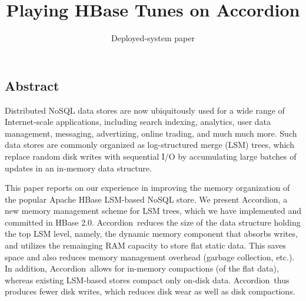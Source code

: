 \documentclass[letterpaper,twocolumn,10pt]{article}
\newcommand{\remove}[1]{}
\newcommand{\tb}{\hspace{5mm}}
\newcommand{\sys}{Accordion}
\begin{document}
\date{}

\title{\Large \bf  Playing HBase Tunes on \sys}


\author{
\remove{
Edward Bortnikov\footnotemark[1]  \tb
Anastasia Braginsky\footnotemark[1]  \tb
Eshcar Hillel\footnotemark[1] \tb 
Idit Keidar\footnotemark[1] \footnotemark[2] \\
	\footnotemark[1] Yahoo Research\ \ \footnotemark[2] Technion  \\ [2mm]
}
Deployed-system paper
} %


\maketitle




\subsection*{Abstract}

Distributed NoSQL data stores are now ubiquitously used for a wide range of Internet-scale applications, 
including search indexing, analytics, user data management, messaging, advertizing, online trading, and much much more.
Such data stores are commonly organized as  log-structured merge (LSM) trees, 
which replace random disk writes with sequential I/O by accumulating large batches of updates 
in an in-memory data structure. 
\remove{
and merging it with  on-disk store in the background. 
}

This paper  reports on our experience in improving the memory organization of the popular 
Apache HBase LSM-based NoSQL store. 
We present \sys, a new memory management scheme for LSM trees, which we have implemented and 
committed in HBase 2.0.
\sys\ reduces the size of the data structure holding the 
 top LSM level, namely, the dynamic memory component that absorbs writes, and utilizes the remainging 
RAM capacity to store flat static data. This  saves space and also reduces  memory management overhead (garbage collection, etc.). 
In addition, \sys\ allows for in-memory compactions (of the flat data), whereas existing LSM-based stores compact only on-disk data. 
\sys\ thus produces  fewer disk writes, which reduces disk wear as well as disk compactions. 
\end{document}
